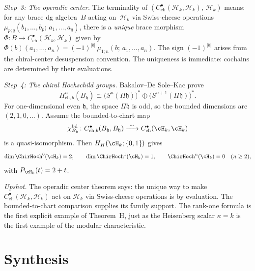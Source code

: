 \begin{computation}
\emph{Step~3: The operadic center.}
The terminality of
$(C^\bullet_{\mathrm{ch}}(\mathcal{H}_k, \mathcal{H}_k),\,
\mathcal{H}_k)$ means: for any brace dg algebra~$B$ acting
on~$\mathcal{H}_k$ via Swiss-cheese operations
$\mu_{p;q}(b_1, \ldots, b_p;\, a_1, \ldots, a_q)$, there is a
\emph{unique} brace morphism
$\Phi \colon B \to C^\bullet_{\mathrm{ch}}(\mathcal{H}_k,
\mathcal{H}_k)$ given by
$\Phi(b)(a_1, \ldots, a_n) = (-1)^{|b|}\,\mu_{1;n}(b;\, a_1,
\ldots, a_n)$.
 The sign $(-1)^{|b|}$ arises from the chiral-center
 desuspension convention. The uniqueness is immediate:
 cochains are determined by their evaluations.

\emph{Step~4: The chiral Hochschild groups.}
Bakalov--De Sole--Kac prove \cite[Theorem~7.4]{BDSK21}
\[
 H^n_{\mathrm{ch},b}(B_{\mathfrak h})
 \cong
 \bigl(S^n(\Pi\mathfrak h)\bigr)^*
 \oplus
 \bigl(S^{n+1}(\Pi\mathfrak h)\bigr)^*.
\]
For one-dimensional even $\mathfrak h$, the space
$\Pi\mathfrak h$ is odd, so the bounded dimensions are
$(2,1,0,\ldots)$.  Assume the bounded-to-chart map
\[
 \chi_{B_{\mathfrak h}}^{\mathrm{bd}}\colon
 C^\bullet_{\mathrm{ch},b}(B_{\mathfrak h},B_{\mathfrak h})
 \xrightarrow{\ \sim\ }
 C^\bullet_{\mathrm{ch}}(\cH_k,\cH_k)
\]
is a quasi-isomorphism.  Then
$H_H(\cH_k;\{0,1\})$ gives
\[
 \dim\ChirHoch^0(\cH_k)=2,
 \qquad
 \dim\ChirHoch^1(\cH_k)=1,
 \qquad
 \ChirHoch^n(\cH_k)=0\quad(n\geq2),
\]
with $P_{\cH_k}(t)=2+t$.

\emph{Upshot.}
The operadic center theorem says: the unique way to make
$C^\bullet_{\mathrm{ch}}(\mathcal{H}_k, \mathcal{H}_k)$ act on
$\mathcal{H}_k$ via Swiss-cheese operations is by evaluation.
The bounded-to-chart comparison supplies its family support.  The
rank-one formula is the first explicit example of Theorem~H, just as
the Heisenberg scalar $\kappa=k$ is the first example of the modular
characteristic.
\end{computation}



\section{Synthesis}
\label{sec:hf-supplement}

